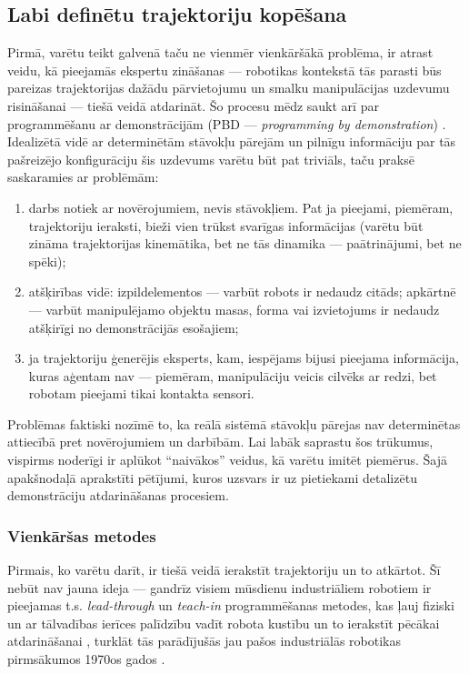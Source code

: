 \documentclass[12pt, a4paper]{article}
\numberwithin{equation}{section} %
\begin{document}
\subsection{Labi definētu trajektoriju kopēšana}

Pirmā, varētu teikt galvenā taču ne vienmēr vienkāršākā problēma, ir atrast veidu, kā pieejamās ekspertu zināšanas --- robotikas kontekstā tās parasti būs pareizas trajektorijas dažādu pārvietojumu un smalku manipulācijas uzdevumu risināšanai --- tiešā veidā atdarināt. Šo procesu mēdz saukt arī par programmēšanu ar demonstrācijām (PBD --- \textit{programming by demonstration}) \cite{muench1994robot,billard2008handbook}. Idealizētā vidē ar determinētām stāvokļu pārejām un pilnīgu informāciju par tās pašreizējo konfigurāciju šis uzdevums varētu būt pat triviāls, taču praksē saskaramies ar problēmām:

\begin{enumerate}
    \item darbs notiek ar novērojumiem, nevis stāvokļiem. Pat ja pieejami, piemēram, trajektoriju ieraksti, bieži vien trūkst svarīgas informācijas (varētu būt zināma trajektorijas kinemātika, bet ne tās dinamika --- paātrinājumi, bet ne spēki);
    \item atšķirības vidē: izpildelementos --- varbūt robots ir nedaudz citāds; apkārtnē --- varbūt manipulējamo objektu masas, forma vai izvietojums ir nedaudz atšķirīgi no demonstrācijās esošajiem;
    \item ja trajektoriju ģenerējis eksperts, kam, iespējams bijusi pieejama informācija, kuras aģentam nav --- piemēram, manipulāciju veicis cilvēks ar redzi, bet robotam pieejami tikai kontakta sensori.
\end{enumerate}

Problēmas faktiski nozīmē to, ka reālā sistēmā stāvokļu pārejas nav determinētas attiecībā pret novērojumiem un darbībām. Lai labāk saprastu šos trūkumus, vispirms noderīgi ir aplūkot ``naivākos'' veidus, kā varētu imitēt piemērus. Šajā apakšnodaļā aprakstīti pētījumi, kuros uzsvars ir uz pietiekami detalizētu demonstrāciju atdarināšanas procesiem.

\subsubsection{Vienkāršas metodes}

Pirmais, ko varētu darīt, ir tiešā veidā ierakstīt trajektoriju un to atkārtot. Šī nebūt nav jauna ideja --- gandrīz visiem mūsdienu industriāliem robotiem ir pieejamas t.s. \textit{lead-through} un \textit{teach-in} programmēšanas metodes, kas ļauj fiziski un ar tālvadības ierīces palīdzību vadīt robota kustību un to ierakstīt pēcākai atdarināšanai \cite{teach_pendant}, turklāt tās parādījušās jau pašos industriālās robotikas pirmsākumos 1970os gados \cite{abb2016special}.
\end{document}
